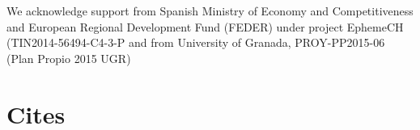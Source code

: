 \documentclass[runningheads,a4paper]{llncs}
\begin{document}
We acknowledge support from 
Spanish Ministry of Economy and Competitiveness and European Regional
Development Fund (FEDER) under project EphemeCH
(TIN2014-56494-C4-3-P and  
from University of Granada, PROY-PP2015-06 (Plan Propio 2015 UGR)
\section{Cites}


\cite{garcia2015evospace}
\cite{garcia2014randomized}
\cite{merelo2012pool}
\cite{mussi2011gpu}
\cite{merelo2013designing}
\cite{merelo2008asynchronous}
\cite{morrison2001measurement}
\cite{roy2009distributed}
\cite{sherry2012flex}
\cite{tanabe2013evaluation}
\cite{de1990analysis}
\cite{melin2013optimal}
\cite{zadeh1988fuzzy}
\cite{zadeh1965fuzzy}
\cite{abdelbar2005fuzzy}
\cite{kenndy1995particle}
\cite{mcnabb2007parallel}
\cite{venter2006parallel}
\cite{koh2006parallel}
\cite{cheng2013population}
\cite{gong2011distributed}



\end{document}
